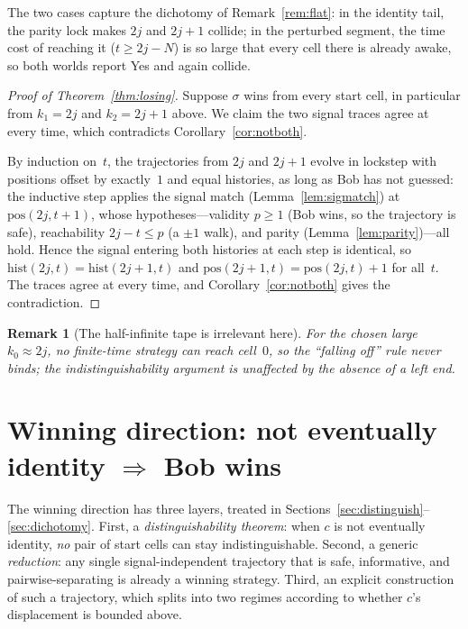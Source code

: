 \documentclass{article}
\newtheorem{remark}[theorem]{Remark}
\newcommand{\Yes}{\textsf{Yes}}
\begin{document}
The two cases capture the dichotomy of Remark~\ref{rem:flat}: in the
identity tail, the parity lock makes $2j$ and $2j{+}1$ collide; in the
perturbed segment, the time cost of reaching it ($t\ge 2j-N$) is so large
that every cell there is already awake, so both worlds report \Yes{} and
again collide.

\begin{proof}[Proof of Theorem~\ref{thm:losing}]
Suppose $\sigma$ wins from every start cell, in particular from
$k_1=2j$ and $k_2=2j{+}1$ above. We claim the two signal traces agree at
every time, which contradicts Corollary~\ref{cor:notboth}.

By induction on~$t$, the trajectories from $2j$ and $2j{+}1$ evolve in
lockstep with positions offset by exactly~$1$ and equal histories, as
long as Bob has not guessed: the inductive step applies the signal match
(Lemma~\ref{lem:sigmatch}) at $\mathrm{pos}(2j,t{+}1)$, whose
hypotheses---validity $p\ge 1$ (Bob wins, so the trajectory is safe),
reachability $2j-t\le p$ (a $\pm1$ walk), and parity
(Lemma~\ref{lem:parity})---all hold. Hence the signal entering both
histories at each step is identical, so
$\mathrm{hist}(2j,t)=\mathrm{hist}(2j{+}1,t)$ and
$\mathrm{pos}(2j{+}1,t)=\mathrm{pos}(2j,t)+1$ for all~$t$. The traces
agree at every time, and Corollary~\ref{cor:notboth} gives the
contradiction.
\end{proof}

\begin{remark}[The half-infinite tape is irrelevant here]
For the chosen large $k_0\approx 2j$, no finite-time strategy can reach
cell~$0$, so the ``falling off'' rule never binds; the indistinguishability
argument is unaffected by the absence of a left end.
\end{remark}

\section{Winning direction: not eventually identity \texorpdfstring{$\Rightarrow$}{implies} Bob wins}
\label{sec:winning}

The winning direction has three layers, treated in
Sections~\ref{sec:distinguish}--\ref{sec:dichotomy}. First, a
\emph{distinguishability theorem}: when $c$ is not eventually identity,
\emph{no} pair of start cells can stay indistinguishable. Second, a
generic \emph{reduction}: any single signal-independent trajectory that is
safe, informative, and pairwise-separating is already a winning strategy.
Third, an explicit construction of such a trajectory, which splits into
two regimes according to whether $c$'s displacement is bounded above.
\end{document}
